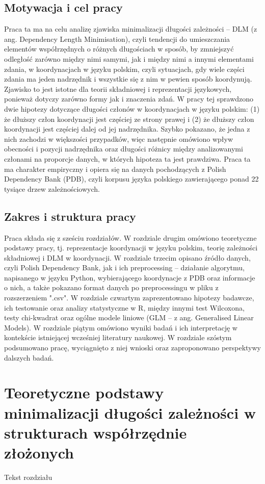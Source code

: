 \documentclass[licencjacka]{pracamgr}
\begin{document}
\section{Motywacja i cel pracy}
Praca ta ma na celu analizę zjawiska minimalizacji długości zależności – DLM (z ang. Dependency Length Minimisation), czyli tendencji do umieszczania elementów współrzędnych o różnych długościach w sposób, by zmniejszyć odległość zarówno między nimi samymi, jak i między nimi a innymi elementami zdania, w koordynacjach w języku polskim, czyli sytuacjach, gdy wiele części zdania ma jeden nadrzędnik i wszystkie się z nim w pewien sposób koordynują. Zjawisko to jest istotne dla teorii składniowej i reprezentacji językowych, ponieważ dotyczy zarówno formy jak i znaczenia zdań. W pracy tej sprawdzono dwie hipotezy dotyczące długości członów w koordynacjach w języku polskim: (1) że dłuższy człon koordynacji jest częściej ze strony prawej i (2) że dłuższy człon koordynacji jest częściej dalej od jej nadrzędnika. Szybko pokazano, że jedna z nich zachodzi w większości przypadków, więc następnie omówiono wpływ obecności i pozycji nadrzędnika oraz długości różnicy między analizowanymi członami na proporcje danych, w których hipoteza ta jest prawdziwa. Praca ta ma charakter empiryczny i opiera się na danych pochodzących z Polish Dependency Bank (PDB), czyli korpusu języka polskiego zawierającego ponad 22 tysiące drzew zależnościowych. 
\section{Zakres i struktura pracy}
Praca składa się z sześciu rozdziałów. W rozdziale drugim omówiono teoretyczne podstawy pracy, tj. reprezentacje koordynacji w języku polskim, teorię zależności składniowej i DLM w koordynacji. W rozdziale trzecim opisano źródło danych, czyli Polish Dependency Bank, jak i ich preprocessing -- działanie algorytmu, napisanego w języku Python, wybierającego koordynacje z PDB oraz informacje o nich, a także pokazano format danych po preprocessingu w pliku z rozszerzeniem ".csv". W rozdziale czwartym zaprezentowano hipotezy badawcze, ich testowanie oraz analizy statystyczne w R, między innymi test Wilcoxona, testy chi-kwadrat oraz ogólne modele liniowe (GLM – z ang. Generalised Linear Models). W rozdziale piątym omówiono wyniki badań i ich interpretację w kontekście istniejącej wcześniej literatury naukowej. W rozdziale szóstym podsumowano pracę, wyciągnięto z niej wnioski oraz zaproponowano perspektywy dalszych badań. 
\chapter{Teoretyczne podstawy minimalizacji długości zależności w strukturach współrzędnie złożonych}
Tekst rozdziału
\end{document}
